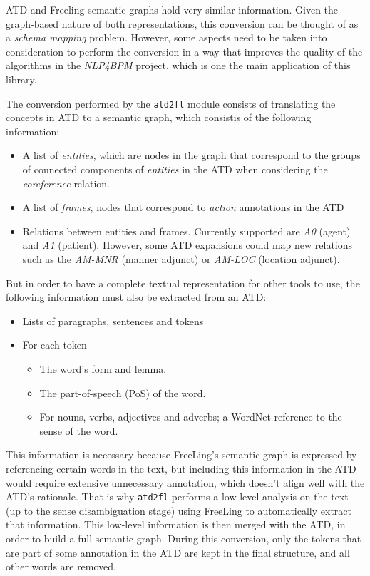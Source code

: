 
ATD and Freeling semantic graphs hold very similar information. Given the
graph-based nature of both representations, this conversion can be thought of as
a \emph{schema mapping} problem. However, some aspects need to be taken into
consideration to perform the conversion in a way that improves the quality of
the algorithms in the \emph{NLP4BPM} project, which is one the main application of
this library.

The conversion performed by the \texttt{atd2fl} module consists of
translating the concepts in ATD to a semantic graph, which consistis of the
following information:

\begin{itemize}
\item A list of \emph{entities}, which are nodes in the graph that correspond
  to the groups of connected components of \emph{entities} in the ATD when
  considering the \emph{coreference} relation. 
\item A list of \emph{frames}, nodes that correspond to \emph{action}
  annotations in the ATD
\item Relations between entities and frames. Currently supported are
  \emph{A0} (agent) and \emph{A1} (patient). However, some ATD expansions
  could map new relations such as the \emph{AM-MNR} (manner adjunct) or
  \emph{AM-LOC} (location adjunct).
\end{itemize}

But in order to have a complete textual representation for other tools to use,
the following information must also be extracted from an ATD:

\begin{itemize}
\item Lists of paragraphs, sentences and tokens
\item For each token \begin{itemize}
  \item The word's form and lemma.
  \item The part-of-speech (PoS) of the word.
  \item For nouns, verbs, adjectives and adverbs; a WordNet reference to the
    sense of the word.
  \end{itemize}
\end{itemize}

This information is necessary because FreeLing's semantic graph is expressed by
referencing certain words in the text, but including this information in
the ATD would require extensive unnecessary annotation, which doesn't align well
with the ATD's rationale. That is why \texttt{atd2fl} performs a low-level
analysis on the text (up to the sense disambiguation stage) using FreeLing to
automatically extract that information. This low-level information is then
merged with the ATD, in order to build a full semantic graph. During this
conversion, only the tokens that are part of some annotation in the ATD are kept
in the final structure, and all other words are removed.




